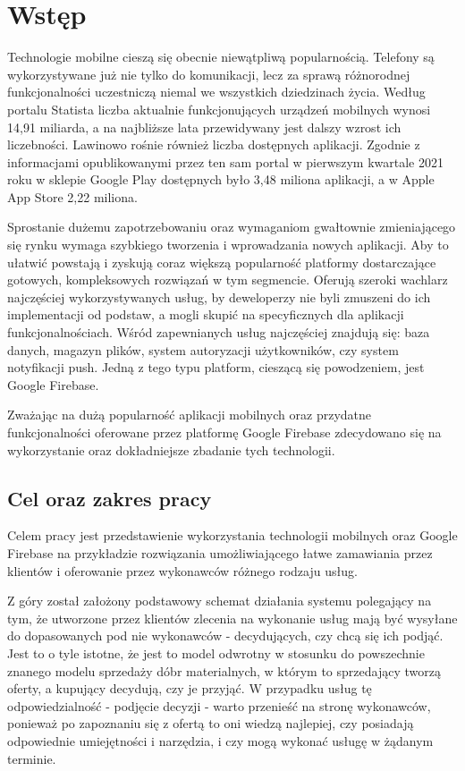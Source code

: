 \chapter{Wstęp}

Technologie mobilne cieszą się obecnie niewątpliwą popularnością. Telefony są wykorzystywane już nie tylko do komunikacji, lecz za sprawą różnorodnej funkcjonalności uczestniczą niemal we wszystkich dziedzinach życia. Według portalu Statista \cite{statista-mobiles-count} liczba aktualnie funkcjonujących urządzeń mobilnych wynosi 14,91 miliarda, a na najbliższe lata przewidywany jest dalszy wzrost ich liczebności. Lawinowo rośnie również liczba dostępnych aplikacji. Zgodnie z informacjami opublikowanymi przez ten sam portal \cite{statista-apps-count} w pierwszym kwartale 2021 roku w sklepie Google Play dostępnych było 3,48 miliona aplikacji, a w Apple App Store 2,22 miliona.

Sprostanie dużemu zapotrzebowaniu oraz wymaganiom gwałtownie zmieniającego się rynku wymaga szybkiego tworzenia i wprowadzania nowych aplikacji. Aby to ułatwić powstają i zyskują coraz większą popularność platformy dostarczające gotowych, kompleksowych rozwiązań w tym segmencie. Oferują szeroki wachlarz najczęściej wykorzystywanych usług, by deweloperzy nie byli zmuszeni do ich implementacji od podstaw, a mogli skupić na specyficznych dla aplikacji funkcjonalnościach. Wśród zapewnianych usług najczęściej znajdują się: baza danych, magazyn plików, system autoryzacji użytkowników, czy system notyfikacji push. Jedną z tego typu platform, cieszącą się powodzeniem, jest Google Firebase.

Zważając na dużą popularność aplikacji mobilnych oraz przydatne funkcjonalności oferowane przez platformę Google Firebase zdecydowano się na wykorzystanie oraz dokładniejsze zbadanie tych technologii.


\section{Cel oraz zakres pracy}

Celem pracy jest przedstawienie wykorzystania technologii mobilnych oraz Google Firebase na przykładzie rozwiązania umożliwiającego łatwe zamawiania przez klientów i oferowanie przez wykonawców różnego rodzaju usług. 

Z góry został założony podstawowy schemat działania systemu polegający na tym, że utworzone przez klientów zlecenia na wykonanie usług mają być wysyłane do dopasowanych pod nie wykonawców - decydujących, czy chcą się ich podjąć. Jest to o tyle istotne, że jest to model odwrotny w stosunku do powszechnie znanego modelu sprzedaży dóbr materialnych, w którym to sprzedający tworzą oferty, a kupujący decydują, czy je przyjąć. W przypadku usług tę odpowiedzialność - podjęcie decyzji - warto przenieść na stronę wykonawców, ponieważ po zapoznaniu się z ofertą to oni wiedzą najlepiej, czy posiadają odpowiednie umiejętności i narzędzia, i czy mogą wykonać usługę w żądanym terminie. 

